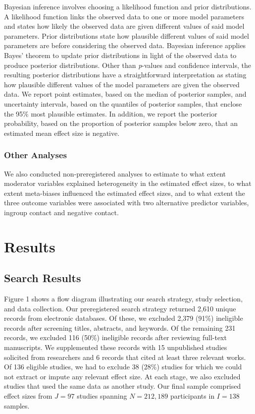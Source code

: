 \documentclass[12pt, letterpaper]{article}
\begin{document}
Bayesian inference involves choosing a likelihood function and prior
distributions. A likelihood function links the observed data to one or
more model parameters and states how likely the observed data are given
different values of said model parameters. Prior distributions state how
plausible different values of said model parameters are before
considering the observed data. Bayesian inference applies Bayes' theorem
to update prior distributions in light of the observed data to produce
posterior distributions. Other than \emph{p}-values and confidence
intervals, the resulting posterior distributions have a straightforward
interpretation as stating how plausible different values of the model
parameters are given the observed data. We report point estimates, based
on the median of posterior samples, and uncertainty intervals, based on
the quantiles of posterior samples, that enclose the 95\% most plausible
estimates. In addition, we report the posterior probability, based on
the proportion of posterior samples below zero, that an estimated mean
effect size is negative.

\hypertarget{other-analyses}{%
\subsubsection{Other Analyses}\label{other-analyses}}

We also conducted non-preregistered analyses to estimate to what extent
moderator variables explained heterogeneity in the estimated effect
sizes, to what extent meta-biases influenced the estimated effect sizes,
and to what extent the three outcome variables were associated with two
alternative predictor variables, ingroup contact and negative contact.

\hypertarget{results}{%
\section{Results}\label{results}}

\hypertarget{search-results}{%
\subsection{Search Results}\label{search-results}}

Figure 1 shows a flow diagram illustrating our search strategy, study
selection, and data collection. Our preregistered search strategy
returned 2,610 unique records from electronic databases. Of these, we
excluded 2,379 (91\%) ineligible records after screening titles,
abstracts, and keywords. Of the remaining 231 records, we excluded 116
(50\%) ineligible records after reviewing full-text manuscripts. We
supplemented these records with 15 unpublished studies solicited from
researchers and 6 records that cited at least three relevant works. Of
136 eligible studies, we had to exclude 38 (28\%) studies for which we
could not extract or impute any relevant effect size. At each stage, we
also excluded studies that used the same data as another study. Our
final sample comprised effect sizes from \(J = 97\) studies spanning
\(N = 212,189\) participants in \(I = 138\) samples.
\end{document}
